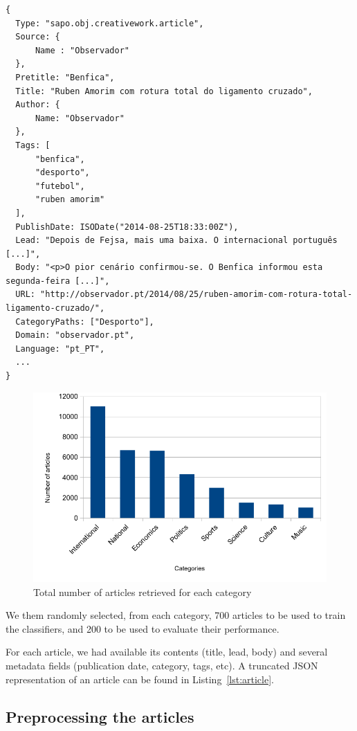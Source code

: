 \documentclass[conference]{IEEEtran}
\begin{document}
\begin{lstlisting}[float,floatplacement=H,caption={Example of JSON representation of an article},label={lst:article}, extendedchars=true]
{
  Type: "sapo.obj.creativework.article",
  Source: {
      Name : "Observador"
  },
  Pretitle: "Benfica",
  Title: "Ruben Amorim com rotura total do ligamento cruzado",
  Author: {
      Name: "Observador"
  },
  Tags: [
      "benfica",
      "desporto",
      "futebol",
      "ruben amorim"
  ],
  PublishDate: ISODate("2014-08-25T18:33:00Z"),
  Lead: "Depois de Fejsa, mais uma baixa. O internacional português [...]",
  Body: "<p>O pior cenário confirmou-se. O Benfica informou esta segunda-feira [...]",
  URL: "http://observador.pt/2014/08/25/ruben-amorim-com-rotura-total-ligamento-cruzado/",
  CategoryPaths: ["Desporto"],
  Domain: "observador.pt",
  Language: "pt_PT",
  ...
}
\end{lstlisting}

\begin{figure}[htbp]
\centerline{\includegraphics[width=.97\columnwidth]{imgs/articles}}
\caption{Total number of articles retrieved for each category}
\label{fig:articles}
\end{figure}

We them randomly selected, from each category, 700 articles to be used
to train the classifiers, and 200 to be used to evaluate their
performance.

For each article, we had available its contents (title, lead, body)
and several metadata fields (publication date, category, tags, etc). A
truncated JSON representation of an article can be found in
Listing~\ref{lst:article}.


\subsection{Preprocessing the articles}
\label{sec:preproc}
\end{document}
